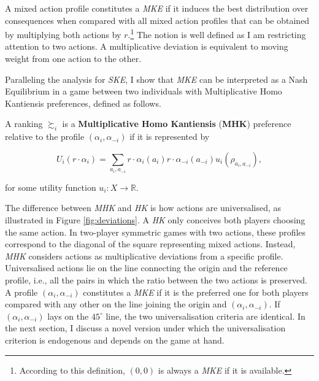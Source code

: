 A mixed action profile constitutes a \textit{MKE} if it induces the best distribution over consequences when compared with all mixed action profiles that can be obtained by multiplying both actions by \( r \).\footnote{According to this definition, \( (0,0) \) is always a \textit{MKE} if it is available.} The notion is well defined as I am restricting attention to two actions. A multiplicative deviation is equivalent to moving weight from one action to the other.

Paralleling the analysis for \textit{SKE}, I show that \textit{MKE} can be interpreted as a Nash Equilibrium in a game between two individuals with Multiplicative Homo Kantiensis preferences, defined as follows.

\begin{definition}\label{definition:mhk}
	A ranking \( \succsim_i \) is a \textbf{Multiplicative Homo Kantiensis} (\textbf{MHK}) preference relative to the profile \( ( \alpha_{i}, \alpha_{-i} ) \) if it is represented by

	\begin{equation}\label{eq:mhk}
		U_i ( r \cdot \alpha_{i} ) = \sum_{a_i, a_{-i}} r \cdot \alpha_{i} (a_i) r \cdot \alpha_{-i} (a_{-i}) u_i(\rho_{a_i, a_{-i}}) ,
	\end{equation}

	for some utility function \(u_i \colon X \rightarrow \mathbb{R}\).
\end{definition}

The difference between \textit{MHK} and \textit{HK} is how actions are universalised, as illustrated in Figure \ref{fig:deviations}. A \textit{HK} only conceives both players choosing the same action. In two-player symmetric games with two actions, these profiles correspond to the diagonal of the square representing mixed actions. Instead, \textit{MHK} considers actions as multiplicative deviations from a specific profile. Universalised actions lie on the line connecting the origin and the reference profile, i.e., all the pairs in which the ratio between the two actions is preserved. A profile \( ( \alpha_i, \alpha_{-i} ) \) constitutes a \textit{MKE} if it is the preferred one for both players compared with any other on the line joining the origin and \( ( \alpha_i, \alpha_{-i} ) \). If \( ( \alpha_i, \alpha_{-i} ) \) lays on the \(45^{\circ}\) line, the two universalisation criteria are identical. In the next section, I discuss a novel version under which the universalisation criterion is endogenous and depends on the game at hand.

